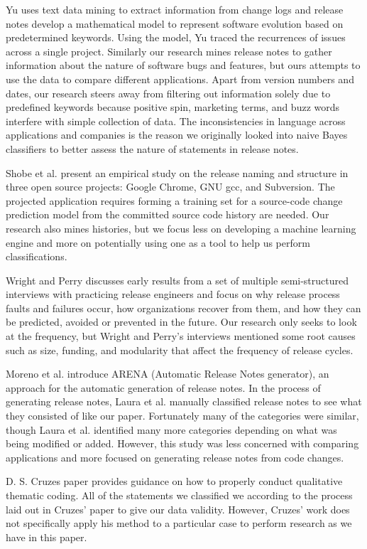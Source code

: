 \documentclass{acm_proc_article-sp}
\begin{document}
Yu \cite{YuChangeLogs} uses text data mining to extract information from change logs and release notes develop a mathematical model to represent software evolution based on predetermined keywords. Using the model, Yu traced the recurrences of issues across a single project.
Similarly our research mines release notes to gather information about the nature of software bugs and features, but ours attempts to use the data to compare different applications. 
Apart from version numbers and dates, our research steers away from filtering out information solely due to predefined keywords because positive spin, marketing terms, and buzz words interfere with simple collection of data. 
The inconsistencies in language across applications and companies is the reason we originally looked into naive Bayes classifiers to better assess the nature of statements in release notes.

Shobe et al. \cite{ShobeMapping} present an empirical study on the release naming and structure in three open source projects: Google Chrome, GNU gcc, and Subversion.  
The projected application requires forming a training set for a source-code change prediction model from the committed source code history are needed.
Our research also mines histories, but we focus less on developing a machine learning engine and more on potentially using one as a tool to help us perform classifications.

Wright and Perry \cite{WrightPitfalls} discusses early results from a set of multiple semi-structured interviews with practicing release engineers and focus on why release process faults and failures occur, how organizations recover from them, and how they can be predicted, avoided or prevented in the future.
Our research only seeks to look at the frequency, but Wright and Perry's interviews mentioned some root causes such as size, funding, and modularity that affect the frequency of release cycles.

Moreno et al. \cite{Laura} introduce ARENA (Automatic Release Notes generator), an approach for the automatic generation of release notes.
In the process of generating release notes, Laura et al. manually classified release notes to see what they consisted of like our paper. Fortunately many of the categories were similar, though Laura et al. identified many more categories depending on what was being modified or added.
However, this study was less concerned with comparing applications and more focused on generating release notes from code changes.

D. S. Cruzes \cite{Cruzes} paper provides guidance on how to properly conduct qualitative thematic coding. 
All of the statements we classified we according to the process laid out in Cruzes' paper to give our data validity. 
However, Cruzes' work does not specifically apply his method to a particular case to perform research as we have in this paper.
\end{document}
